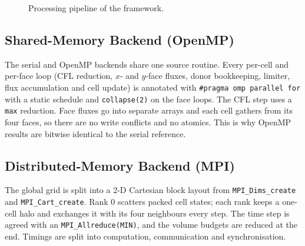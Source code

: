 \documentclass[conference]{IEEEtran}
\begin{document}
\begin{figure}[t]
\centering
\setlength{\fboxsep}{4pt}
\caption{Processing pipeline of the framework.}
\label{fig:pipeline}
\end{figure}

\subsection{Shared-Memory Backend (OpenMP)}
The serial and OpenMP backends share one source routine. Every per-cell and
per-face loop (CFL reduction, $x$- and $y$-face fluxes, donor bookkeeping,
limiter, flux accumulation and cell update) is annotated with
\texttt{\#pragma omp parallel for} with a static schedule and
\texttt{collapse(2)} on the face loops. The CFL step uses a \texttt{max}
reduction. Face fluxes go into separate arrays and each cell gathers from its
four faces, so there are no write conflicts and no atomics. This is why OpenMP
results are bitwise identical to the serial reference.

\subsection{Distributed-Memory Backend (MPI)}
The global grid is split into a 2-D Cartesian block layout from
\texttt{MPI\_Dims\_create} and \texttt{MPI\_Cart\_create}. Rank 0 scatters
packed cell states; each rank keeps a one-cell halo and exchanges it with its
four neighbours every step. The time step is agreed with an
\texttt{MPI\_Allreduce(MIN)}, and the volume budgets are reduced at the end.
Timings are split into computation, communication and synchronisation.
\end{document}
